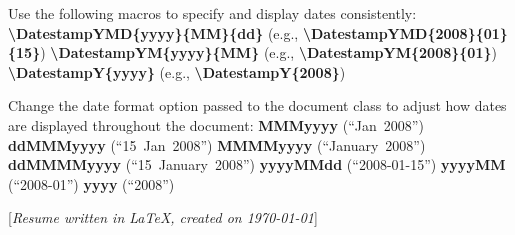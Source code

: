 \documentclass[letterpaper,MMMMyyyy,nonstopmode]{simpleresumecv}
\newcommand{\CVNote}{Resume written in \LaTeX, created on {\today}}
\newcommand{\Code}[1]{\mbox{\textbf{#1}}}
\newcommand{\CodeCommand}[1]{\mbox{\textbf{\textbackslash{#1}}}}
\begin{document}
\begin{Body}
\Gap
\BulletItem
Use the following macros to specify and display dates consistently:
\SubBulletItem
\CodeCommand{DatestampYMD\{yyyy\}\{MM\}\{dd\}}
(e.g., \CodeCommand{DatestampYMD\{2008\}\{01\}\{15\}})
\SubBulletItem
\CodeCommand{DatestampYM\{yyyy\}\{MM\}}
(e.g., \CodeCommand{DatestampYM\{2008\}\{01\}})
\SubBulletItem
\CodeCommand{DatestampY\{yyyy\}}
(e.g., \CodeCommand{DatestampY\{2008\}})

\Gap
\BulletItem
Change the date format option passed to the document class to adjust how dates are displayed throughout the document:
\SubBulletItem
\Code{MMMyyyy} (``Jan~2008'')
\SubBulletItem
\Code{ddMMMyyyy} (``15~Jan~2008'')
\SubBulletItem
\Code{MMMMyyyy} (``January~2008'')
\SubBulletItem
\Code{ddMMMMyyyy} (``15~January~2008'')
\SubBulletItem
\Code{yyyyMMdd} (``2008-01-15'')
\SubBulletItem
\Code{yyyyMM} (``2008-01'')
\SubBulletItem
\Code{yyyy} (``2008'')

\endgroup

\fi

\end{Body}


\UseNoteFont%
\null\hfill%
[\textit{\CVNote}]
\end{document}

